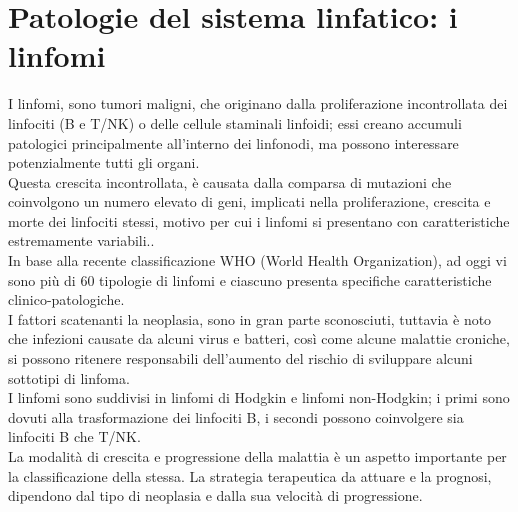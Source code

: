 \section{Patologie del sistema linfatico: i linfomi}
I linfomi, sono tumori maligni, che originano dalla proliferazione incontrollata dei linfociti (B e T/NK)
o delle cellule staminali linfoidi; essi creano accumuli patologici principalmente
all'interno dei linfonodi, ma possono interessare potenzialmente tutti gli organi.\\ 
Questa crescita incontrollata, è causata dalla comparsa di mutazioni che coinvolgono un numero elevato di geni, 
implicati nella proliferazione, crescita e morte dei linfociti stessi, motivo 
per cui i linfomi si presentano con caratteristiche estremamente variabili.\cite{LINFOMIAIL}.\\ 
In base alla recente classificazione WHO (World Health Organization), ad oggi vi sono più di 60 tipologie di linfomi 
e ciascuno presenta specifiche caratteristiche clinico-patologiche\cite{AIOM}.\\
I fattori scatenanti la neoplasia, sono in gran parte sconosciuti, tuttavia è noto che infezioni causate da alcuni virus e 
batteri, così come alcune malattie croniche, si possono ritenere responsabili dell’aumento del rischio di
sviluppare alcuni sottotipi di linfoma\cite{LINFOMIAIL}.\\
I linfomi sono suddivisi in linfomi di Hodgkin e linfomi non-Hodgkin; 
i primi sono dovuti alla trasformazione dei linfociti B, i secondi possono coinvolgere sia linfociti B che T/NK.\\ 
La modalità di crescita e progressione della malattia è un aspetto importante per la classificazione della stessa.
La strategia terapeutica da attuare e la prognosi, dipendono dal tipo di neoplasia e dalla sua velocità di 
progressione\cite{LINFOMIAIL}.

